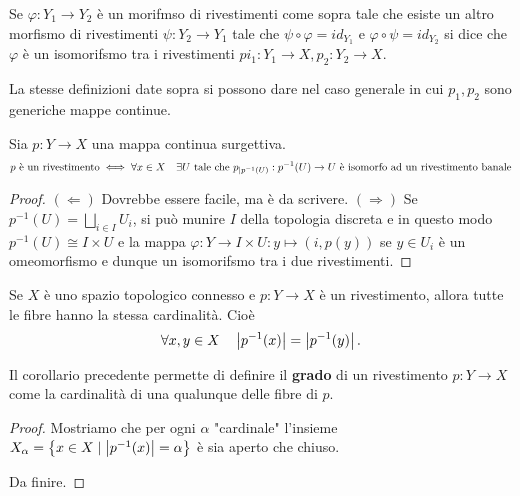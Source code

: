 \documentclass[]{article}
\begin{document}
\begin{definition}  \nl
    Se $\varphi: Y_1 \to Y_2$ \`e un morifmso di rivestimenti come sopra tale che esiste un altro morfismo
    di rivestimenti $\psi: Y_2 \to Y_1$ tale che $\psi \circ \varphi = id_{Y_1}$ e $\varphi \circ \psi = id_{Y_2}$
    si dice che $\varphi$ \`e un isomorifsmo tra i rivestimenti $pi_1: Y_1 \to X, p_2: Y_2 \to X$.
\end{definition}

\begin{definition}  \nl
    La stesse definizioni date sopra si possono dare nel caso generale in cui $p_1, p_2$ sono generiche mappe continue.
\end{definition}

\begin{proposition}  \nl
    Sia $p: Y \to X$ una mappa continua surgettiva. \nl
    \[
        p \text{ \`e un rivestimento} \iff \forall x \in X \quad \exists U \text{ tale che } p_{|p^{-1}(U)}: p^{-1}(U) \to U \text{ \`e isomorfo ad un rivestimento banale}
    \]
\end{proposition}

\begin{proof} \nl
    $(\Leftarrow)$ Dovrebbe essere facile, ma \`e da scrivere. \nl
    $(\Rightarrow)$ Se $p^{-1}(U) = \bigsqcup_{i \in I} U_i$, si pu\`o munire $I$ della topologia discreta
    e in questo modo $p^{-1}(U) \cong I \times U$ e la mappa $\varphi: Y \to I \times U: y \mapsto (i, p(y))$ se $y \in U_i$ \`e un omeomorfismo e dunque un isomorifsmo tra i due rivestimenti.
\end{proof}

\begin{corollary}  \nl
    Se $X$ \`e uno spazio topologico connesso e $p: Y \to X$ \`e un rivestimento, allora tutte le fibre hanno la stessa cardinalit\`a. \nl
    Cio\`e \[
        \forall x,y \in X \quad \left| p^{-1}(x) \right| = \left| p^{-1}(y) \right|.
    \]
\end{corollary}

\begin{definition}  \nl
    Il corollario precedente permette di definire il \textbf{grado} di un rivestimento $p: Y \to X$ come la cardinalit\`a di una qualunque delle fibre di $p$.
\end{definition}

\begin{proof}
    Mostriamo che per ogni $\alpha$ "cardinale" l'insieme $X_{\alpha} = \left\{ x \in X \mid \left| p^{-1}(x) \right| = \alpha \right\}$ \`e sia aperto che chiuso. \nl

    Da finire.
\end{proof}
\end{document}
